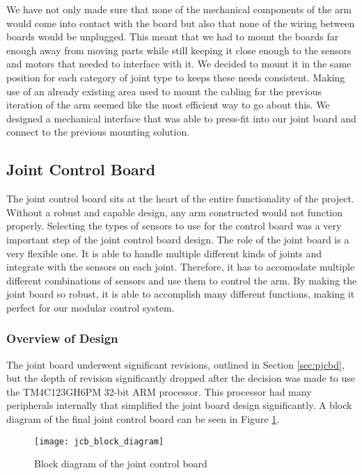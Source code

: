 \noindent We have not only made sure that none of the mechanical components of the arm would come into contact with the board but also that none of the wiring between boards would be unplugged. This meant that we had to mount the boards far enough away from moving parts while still keeping it close enough to the sensors and motors that needed to interface with it. We decided to mount it in the same position for each category of joint type to keeps these needs consistent. Making use of an already existing area used to mount the cabling for the previous iteration of the arm seemed like the most efficient way to go about this. We designed a mechanical interface that was able to press-fit into our joint board and connect to the previous mounting solution.


\subsection{Joint Control Board}
The joint control board sits at the heart of the entire functionality of the project. Without a robust and capable design, any arm constructed would not function properly. Selecting the types of sensors to use for the control board was a very important step of the joint control board design. The role of the joint board is a very flexible one. It is able to handle multiple different kinds of joints and integrate with the sensors on each joint. Therefore, it has to accomodate multiple different combinations of sensors and use them to control the arm. By making the joint board so robust, it is able to accomplish many different functions, making it perfect for our modular control system.

\subsubsection{Overview of Design}
The joint board underwent significant revisions, outlined in Section \ref{sec:pjcbd}, but the depth of revision significantly dropped after the decision was made to use the TM4C123GH6PM 32-bit ARM processor. This processor had many peripherals internally that simplified the joint board design significantly. A block diagram of the final joint control board can be seen in Figure \ref{fig:jcb_block_diagram}.

\begin{figure}[H]
	\centering
	\texttt{[image: jcb\_block\_diagram]}
	\caption{Block diagram of the joint control board}
	\label{fig:jcb_block_diagram}
\end{figure}

